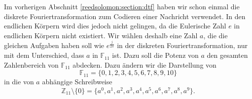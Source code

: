 Im vorherigen Abschnitt \ref{reedsolomon:section:dtf} haben wir schon einmal die diskrete Fouriertransformation zum Codieren einer Nachricht verwendet. In den endlichen Körpern wird dies jedoch nicht gelingen, da die Eulerische Zahl $e$ in endlichen Körpern nicht existiert.
Wir wählen deshalb eine Zahl $a$, die die gleichen Aufgaben haben soll wie $e^{\frac{j}{2 \pi}}$ in der diskreten Fouriertransformation, nur mit dem Unterschied, dass $a$ in $\mathbb{F}_{11}$ ist. Dazu soll die Potenz von $a$ den gesamten Zahlenbereich von $\mathbb{F}_{11}$ abdecken.
Dazu ändern wir die Darstellung von
\[
\mathbb{F}_{11} = \{0,1,2,3,4,5,6,7,8,9,10\}
\]
in die von $a$ abhängige Schreibweise 
\[
\mathbb{Z}_{11}\setminus\{0\} = \{a^0, a^1, a^2, a^3, a^4, a^5, a^6, a^7, a^8, a^9\}.
\]
%


